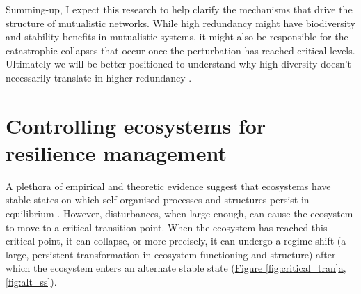 \documentclass[a4paper]{article}
\begin{document}
Summing-up, I expect this research to help clarify the mechanisms that drive the structure of mutualistic networks.
While high redundancy might have biodiversity and stability benefits in mutualistic systems, it might also be responsible for the catastrophic collapses that occur once the perturbation has reached critical levels.
Ultimately we will be better positioned to understand why high diversity doesn't necessarily translate in higher redundancy \autocite{Bellwood2003b}.










\section{Controlling ecosystems for resilience management}

A plethora of empirical and theoretic evidence suggest that ecosystems have stable states on which self-organised processes and structures persist in equilibrium \autocite{Gunderson2000,Ives2007}.
However, disturbances, when large enough, can cause the ecosystem to move to a critical transition point.
When the ecosystem has reached this critical point, it can collapse, or more precisely, it can undergo a regime shift (a large, persistent transformation in ecosystem functioning and structure) after which the ecosystem enters an alternate stable state \autocite{Holling1973,May1976, Gunderson2000} (\hyperref[fig:critical_tran]{Figure \ref{fig:critical_tran}a}, \ref{fig:alt_ss}).
\end{document}
